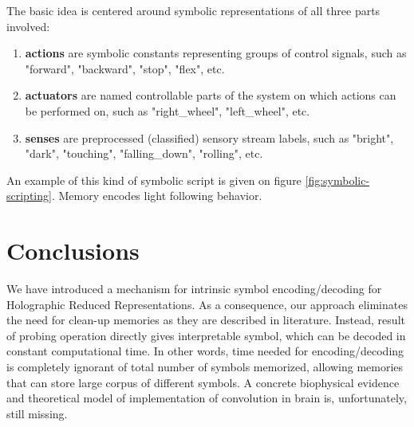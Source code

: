 \documentclass[conference]{IEEEtran}
\begin{document}
The basic idea is centered around symbolic representations of all three parts involved:
\begin{enumerate}
	\item \textbf{actions} are symbolic constants representing groups of control signals, such as "forward", "backward", "stop", "flex", etc.
	
	\item \textbf{actuators} are named controllable parts of the system on which actions can be performed on, such as "right\_wheel", "left\_wheel", etc.
	
	\item \textbf{senses} are preprocessed (classified) sensory stream labels, such as "bright", "dark", "touching", "falling\_down", "rolling", etc.
\end{enumerate}

An example of this kind of symbolic script is given on figure \ref{fig:symbolic-scripting}. Memory encodes light following behavior.

	\section{Conclusions}
	We have introduced a mechanism for intrinsic symbol encoding/decoding for Holographic Reduced Representations.
As a consequence, our approach eliminates the need for clean-up memories as they are described in literature.
Instead, result of probing operation directly gives interpretable symbol, which can be decoded in constant computational time.
In other words, time needed for encoding/decoding is completely ignorant of total number of symbols memorized, allowing memories that can store large corpus of different symbols.
	A concrete biophysical evidence and theoretical model of implementation of convolution in brain is, unfortunately, still missing.
	
	\printbibliography[heading=bibintoc]
	
\end{document}
